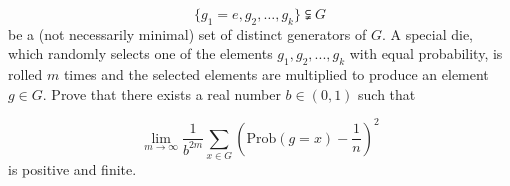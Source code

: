 \[ \{g_1=e,g_2,\dots,g_k\} \subsetneqq G \]
be a (not necessarily minimal) set of distinct generators of $G$. A special
die, which randomly selects one of the elements $g_1,g_2,...,g_k$ with equal
probability, is rolled $m$ times and the selected elements are multiplied
to produce an element $g \in G$.  Prove that there exists a real number
$b \in (0,1)$ such that

\[ \lim_{m\to\infty} \frac{1}{b^{2m}} \sum_{x\in G} \left(\mathrm{Prob}(g=x)
    - \frac{1}{n}\right)^2 \]
is positive and finite.
